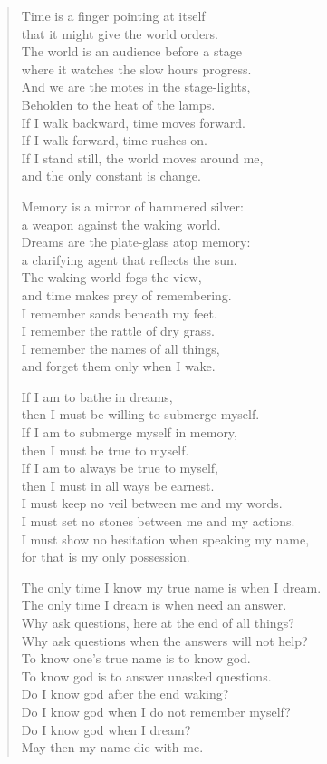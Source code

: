 \begin{verse}
Time is a finger pointing at itself\\
that it might give the world orders.\\
The world is an audience before a stage\\
where it watches the slow hours progress.\\
And we are the motes in the stage-lights,\\
Beholden to the heat of the lamps.\\
If I walk backward, time moves forward.\\
If I walk forward, time rushes on.\\
If I stand still, the world moves around me,\\
and the only constant is change.

Memory is a mirror of hammered silver:\\
a weapon against the waking world.\\
Dreams are the plate-glass atop memory:\\
a clarifying agent that reflects the sun.\\
The waking world fogs the view,\\
and time makes prey of remembering.\\
I remember sands beneath my feet.\\
I remember the rattle of dry grass.\\
I remember the names of all things,\\
and forget them only when I wake.

If I am to bathe in dreams,\\
then I must be willing to submerge myself.\\
If I am to submerge myself in memory,\\
then I must be true to myself.\\
If I am to always be true to myself,\\
then I must in all ways be earnest.\\
I must keep no veil between me and my words.\\
I must set no stones between me and my actions.\\
I must show no hesitation when speaking my name,\\
for that is my only possession.

The only time I know my true name is when I dream.\\
The only time I dream is when need an answer.\\
Why ask questions, here at the end of all things?\\
Why ask questions when the answers will not help?\\
To know one's true name is to know god.\\
To know god is to answer unasked questions.\\
Do I know god after the end waking?\\
Do I know god when I do not remember myself?\\
Do I know god when I dream?\\
May then my name die with me.


\end{verse}
